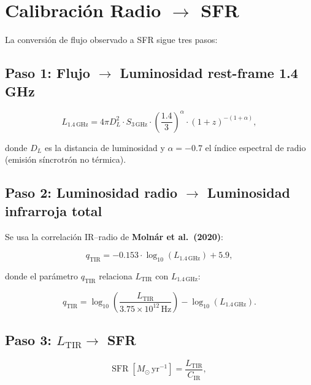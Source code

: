 \documentclass[12pt, a4paper]{article}
\begin{document}
\section{Calibración Radio \texorpdfstring{$\to$}{→} SFR}

La conversión de flujo observado a SFR sigue tres pasos:

\subsection{Paso 1: Flujo $\to$ Luminosidad rest-frame 1.4\,GHz}

\begin{equation}
    L_{1.4\,\text{GHz}} = 4\pi D_L^2 \cdot S_{3\,\text{GHz}}
    \cdot \left(\frac{1.4}{3}\right)^{\alpha} \cdot (1+z)^{-(1+\alpha)},
    \label{eq:lum}
\end{equation}

donde $D_L$ es la distancia de luminosidad y $\alpha = -0.7$ el índice espectral
de radio (emisión síncrotrón no térmica).

\subsection{Paso 2: Luminosidad radio $\to$ Luminosidad infrarroja total}

Se usa la correlación IR--radio de \textbf{Moln\'ar et al.\ (2020)}:

\begin{equation}
    q_{\text{TIR}} = -0.153 \cdot \log_{10}(L_{1.4\,\text{GHz}}) + 5.9,
    \label{eq:qtir}
\end{equation}

donde el parámetro $q_{\text{TIR}}$ relaciona $L_{\text{TIR}}$ con $L_{1.4\,\text{GHz}}$:

\begin{equation}
    q_{\text{TIR}} = \log_{10}\!\left(\frac{L_{\text{TIR}}}{3.75\times10^{12}\,\text{Hz}}\right)
    - \log_{10}(L_{1.4\,\text{GHz}}).
    \label{eq:qdef}
\end{equation}

\subsection{Paso 3: $L_{\text{TIR}} \to$ SFR}

\begin{equation}
    \text{SFR}\;[M_\odot\,\text{yr}^{-1}]
    = \frac{L_{\text{TIR}}}{C_{\text{IR}}},
    \label{eq:sfr}
\end{equation}
\end{document}
